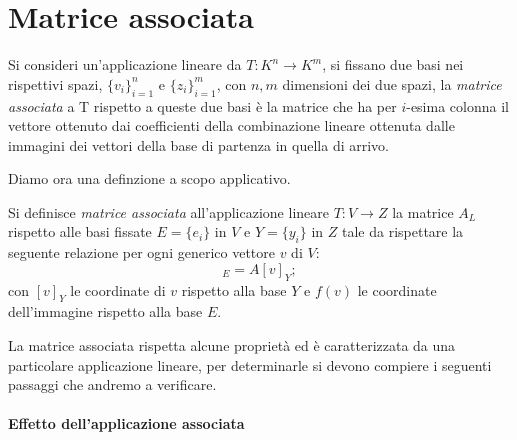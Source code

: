 \section{Matrice associata}
\begin{definizione} \label{d:matrice-associata}
	Si consideri un'applicazione lineare da $T\colon K^n\to K^m$, si fissano due basi nei rispettivi spazi, $\{v_i\}_{i=1}^n$ e $\{z_i\}_{i=1}^m$, con $n, m$ dimensioni dei due spazi, la \emph{matrice associata} a T rispetto a queste due basi è la matrice che ha per $i$-esima colonna il vettore ottenuto dai coefficienti della combinazione lineare ottenuta dalle immagini dei vettori della base di partenza in quella di arrivo.
\end{definizione}
Diamo ora una definzione a scopo applicativo.
\begin{definizione} 
	Si definisce \emph{matrice associata} all'applicazione lineare $T\colon V\to Z$ la matrice $A_L$ rispetto alle basi fissate $E =\{e_i\}$ in $V$ e $Y =\{y_i\}$ in  $Z$ tale da rispettare la seguente relazione per ogni generico vettore $  v$ di $V$:
	\begin{equation*}
		[f(  v)]_E = A[  v]_Y;
	\end{equation*}
	con $[  v]_Y$ le coordinate di $  v$ rispetto alla base $Y$ e  $f(  v)$ le coordinate dell'immagine rispetto alla base $E$.
\end{definizione}
La matrice associata rispetta alcune proprietà ed è caratterizzata da una particolare applicazione lineare, per determinarle si devono compiere i seguenti passaggi che andremo a verificare.

\paragraph{Effetto dell'applicazione associata}

